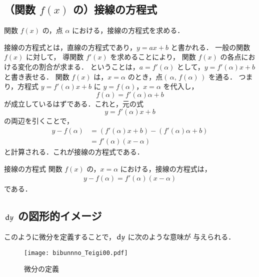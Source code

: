             \subsection{（関数 $f(x)$ の）接線の方程式}
            関数 $f(x)$ の，点 $\alpha$ における，接線の方程式を求める．

            接線の方程式とは，直線の方程式であり，$y=ax+b$ と書かれる．
            一般の関数 $f(x)$ に対して，
            導関数 $f'(x)$ を求めることにより，
            関数 $f(x)$ の各点における変化の割合が求まる．
            ということは，$a=f'(\alpha)$ として，$y=f'(\alpha)x+b$ と書き表せる．
            関数 $f(x)$ は，$x=\alpha$ のとき，点$(\,\alpha,\,f(\alpha)\,)$ を通る．
            つまり，方程式 $y=f'(\alpha)x+b$ に $y=f(\alpha)$，$x=\alpha$ を代入し，
                \begin{equation*}
                    f(\alpha) = f'(\alpha)\alpha + b
                \end{equation*}
            が成立しているはずである．これと，元の式
                \begin{equation*}
                    y=f'(\alpha)x+b
                \end{equation*}
            の両辺を引くことで，
                \begin{align*}
                    y - f(\alpha) &=   \left( f'(\alpha)x      + b \right)
                                      - \left( f'(\alpha)\alpha + b \right) \\
                                  &= f'(\alpha) \left( x-\alpha \right)
                \end{align*}
            と計算される．これが接線の方程式である．\\

            \begin{itembox}[l]{接線の方程式}
            関数 $f(x)$ の，$x=\alpha$ における，接線の方程式は，
            \begin{align}
                y - f(\alpha)=f'(\alpha) \left( x-\alpha \right)
            \end{align}
            である．
            \end{itembox}

            \subsection{$\,\mathrm{d} y$ の図形的イメージ}
                このように微分を定義することで，$\,\mathrm{d} y$ に次のような意味が
                与えられる．
                \begin{figure}[hbt]
                    \begin{center}
                        \texttt{[image: bibunnno\_Teigi00.pdf]}
                        \caption{微分の定義}
                        \label{fig:bibunnno_Teigi00}
                    \end{center}
                \end{figure}

